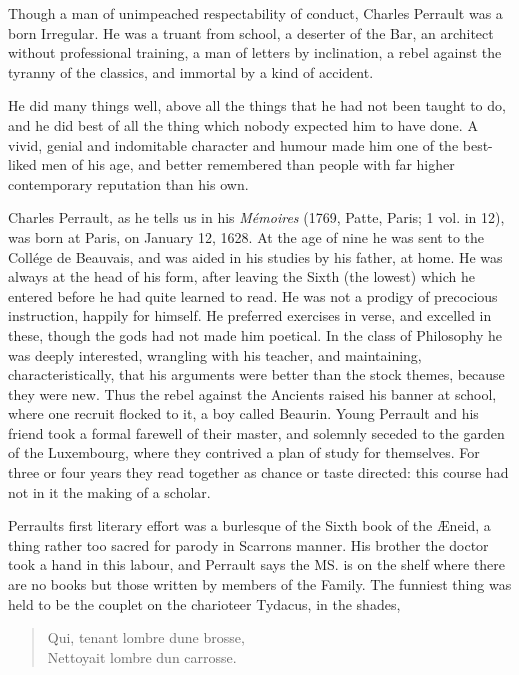 \documentclass[14pt,a4paper]{memoir}
\begin{document}
Though a man of unimpeached respectability of conduct, Charles Perrault
was a born Irregular. He was a truant from school, a deserter of the
Bar, an architect without professional training, a man of letters by
inclination, a rebel against the tyranny of the classics, and immortal
by a kind of accident.

He did many things well, above all the things that he had not been
taught to do, and he did best of all the thing which nobody expected him
to have done. A vivid, genial and indomitable character and humour made
him one of the best-liked men of his age, and better remembered than
people with far higher contemporary reputation than his own.

Charles Perrault, as he tells us in his \emph{Mémoires} (1769, Patte,
Paris; 1 vol. in 12), was born at Paris, on January 12, 1628. At the age
of nine he was sent to the Collége de Beauvais, and was aided in his
studies by his father, at home. He was always at the head of his form,
after leaving the Sixth (the lowest) which he entered before he had
quite learned to read. He was not a prodigy of precocious instruction,
happily for himself. He preferred exercises in verse, and excelled in
these, though the gods had not made him poetical. In the class of
Philosophy he was deeply interested, wrangling with his teacher, and
maintaining, characteristically, that his arguments were better than the
stock themes, \textquotesingle because they were new.\textquotesingle{}
Thus the rebel against the Ancients raised his banner at school, where
one recruit flocked to it, a boy called Beaurin. Young Perrault and his
friend took a formal farewell of their master, and solemnly seceded to
the garden of the Luxembourg, where they contrived a plan of study for
themselves. For three or four years they read together as chance or
taste directed: this course had not in it the making of a scholar.

Perrault\textquotesingle s first literary effort was a burlesque of the
Sixth book of the Æneid, a thing rather too sacred for parody in
Scarron\textquotesingle s manner. His brother the doctor took a hand in
this labour, and Perrault says \textquotesingle the MS. is on the shelf
where there are no books but those written by members of the
Family.\textquotesingle{} The funniest thing was held to be the couplet
on the charioteer Tydacus, in the shades,

\begin{verse}
\small
Qui, tenant l\textquotesingle ombre d\textquotesingle une brosse, \\
Nettoyait l\textquotesingle ombre d\textquotesingle un carrosse.
\end{verse}
\end{document}
